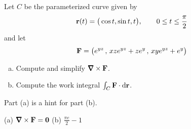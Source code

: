 \begin{question}[M317 2015A]  %
Let $C$ be the parameterized curve given by
\begin{equation*}
\mathbf{r}(t) = \big(\cos t, \sin t, t\big),\qquad
0 \le t \le \frac{\pi}{2}
\end{equation*}
and let
\begin{equation*}
\mathbf{F} = \big(e^{yz}\,,\, xze^{yz} + ze^y\,,\, xye^{yz} + e^y\big)
\end{equation*}
\begin{enumerate}[(a)]
\item
Compute and simplify $\vnabla\times\vF$.

\item
Compute the work integral $\int_C\mathbf{F}\cdot\mathrm{d}\mathbf{r}$.
\end{enumerate}
\end{question}

\begin{hint} 
Part (a) is a hint for part (b).
\end{hint}

\begin{answer} 
(a) $\vnabla\times\vF=\vZero$ \qquad
(b) $\frac{\pi e}{2} - 1$
\end{answer}

